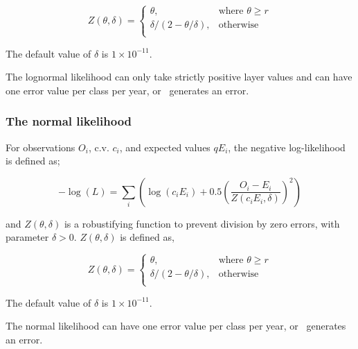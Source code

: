 \begin{equation}
   Z \left(\theta,\delta \right) = \begin{cases}
	  \theta, & \text{where $\theta \ge r$} \\
	  \delta/\left( 2-\theta/\delta \right), & \text{otherwise} \\  
  \end{cases}
\end{equation}

The default value of $\delta$ is $1 \times 10^{-11}$.

\TODO

The lognormal likelihood can only take strictly positive layer values and can have one error value per class per year, or \SPM\ generates an error.

\TODOend

\subsubsection*{The normal likelihood}

For observations $O_i$, c.v. $c_i$, and expected values $qE_i$, the negative log-likelihood is defined as;

\begin{equation}
 - \log \left(L \right) = \sum\limits_i \left( \log \left( c_i E_i \right) +0.5 \left( \frac{O_i-E_i}{Z\left(c_i E_i,\delta \right)}\right)^2\right)
\end{equation}

and $Z \left(\theta,\delta \right)$ is a robustifying function to prevent division by zero errors, with parameter $\delta>0$. $Z \left(\theta,\delta \right)$ is defined as,

\begin{equation}
   Z \left(\theta,\delta \right) = \begin{cases}
	  \theta, & \text{where $\theta \ge r$} \\
	  \delta/\left( 2-\theta/\delta \right), & \text{otherwise} \\  
  \end{cases}
\end{equation}

The default value of $\delta$ is $1 \times 10^{-11}$.

\TODO

The normal likelihood can have one error value per class per year, or \SPM\ generates an error.

\TODOend

\subsection{}

